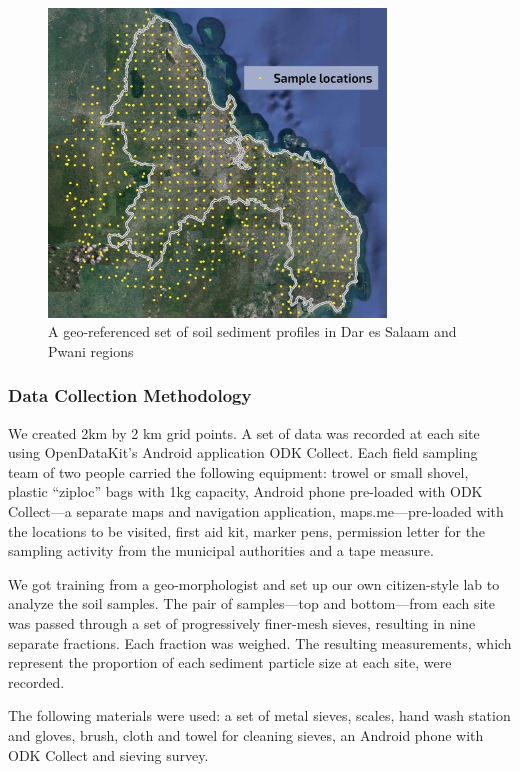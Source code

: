 \documentclass[a4paper,12pt,twoside]{article}
\begin{document}
\begin{figure}[h]
  {\color{RHblue}\caption{A geo-referenced set of soil sediment profiles in Dar es Salaam and Pwani regions}}
  \centering
  \includegraphics[width=0.8\textwidth]{images/soil_sample_locations.jpg}
\end{figure}

\subsubsection{Data Collection Methodology}

\begin{multicols}{2}
We created 2km by 2 km grid points. A set of data was recorded at each site using OpenDataKit’s Android application ODK Collect. Each field sampling team of two people carried the following equipment: trowel or small shovel, plastic “ziploc” bags with 1kg capacity, Android phone pre-loaded with ODK Collect---a separate maps and navigation application, maps.me---pre-loaded with the locations to be visited, first aid kit, marker pens, permission letter for the sampling activity from the municipal authorities and a tape measure.

We got training from a geo-morphologist and set up our own citizen-style lab to analyze the soil samples. The pair of samples—top and bottom—from each site was passed through a set of progressively finer-mesh sieves, resulting in nine separate fractions. Each fraction was weighed. The resulting measurements, which represent the proportion of each sediment particle size at each site, were
recorded.

The following materials were used: a set of metal sieves, scales, hand wash station and gloves, brush, cloth and towel for cleaning sieves, an Android phone with ODK Collect and sieving survey.
\end{multicols}
\end{document}
